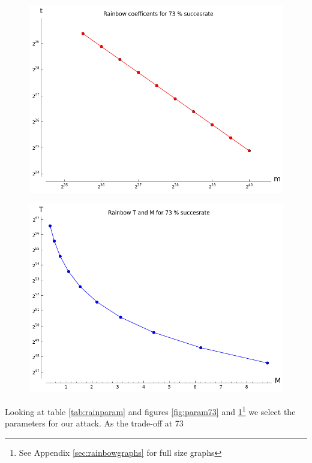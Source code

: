 \begin{figure}[H]
  \centering
  \begin{minipage}{.5\textwidth}
    \centering
    \includegraphics[scale=0.3]{figures/RainbowCoef73.png}
    \label{fig:param73}
  \end{minipage}%
  \begin{minipage}{.5\textwidth}
    \centering
    \includegraphics[scale=0.3]{figures/RainbowTime73.png}
    \label{fig:time73}
  \end{minipage}
\end{figure}
Looking at table \ref{tab:rainparam} and figures \ref{fig:param73}
and \ref{fig:time73}\footnote{See Appendix \ref{sec:rainbowgraphs} for
  full size graphs} we select the parameters for our attack. As the trade-off at 73%


